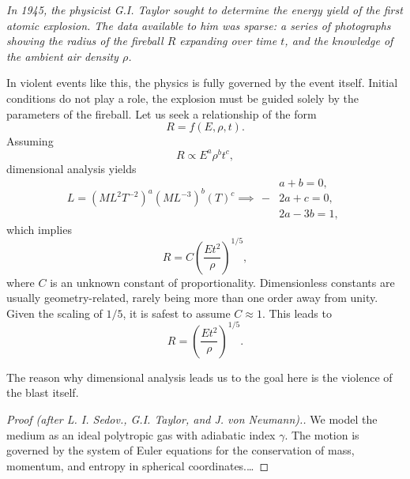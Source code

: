 \documentclass{antiquebook}
\begin{document}
    \begin{problem}
        \textit{In 1945, the physicist G.I. Taylor sought to determine the energy yield of the first atomic explosion. The data available to him was sparse: a series of photographs showing the radius of the fireball $R$ expanding over time $t$, and the knowledge of the ambient air density $\rho$.}
    \end{problem}
    \begin{solution}
        In violent events like this, the physics is fully governed by the event itself. Initial conditions do not play a role, the explosion must be guided solely by the parameters of the fireball. Let us seek a relationship of the form
        \begin{equation}
            R = f(E, \rho, t).
        \end{equation}
        Assuming
        \begin{equation}
            R \propto E^a \rho^b t^c,
        \end{equation}
        dimensional analysis yields
        \begin{equation}
            L = {(M L^2 T^{-2})}^a {(M L^{-3})}^b (T)^c \implies \begin{aligned}
                &a + b = 0,\\
                -&2a + c = 0,\\
                &2a - 3b = 1,
            \end{aligned}
        \end{equation}
        which implies
        \begin{equation}
            R = C \left( \frac{E t^2}{\rho}\right)^{1/5},
        \end{equation}
        where \(C\) is an unknown constant of proportionality. Dimensionless constants are usually geometry-related, rarely being more than one order away from unity. Given the scaling of \(1/5\), it is safest to assume \(C \approx 1\). This leads to
        \begin{equation}
            R = {\left( \frac{E t^2}{\rho}\right)}^{1/5}.
        \end{equation}
    \end{solution}
    \begin{note}
        The reason why dimensional analysis leads us to the goal here is the violence of the blast itself.
    \end{note}
    \begin{proof}[Proof \textit{(after L. I. Sedov., G.I. Taylor, and J. von Neumann)}.]\small
        We model the medium as an ideal polytropic gas with adiabatic index $\gamma$. The motion is governed by the system of Euler equations for the conservation of mass, momentum, and entropy in spherical coordinates.\dots
\end{proof}
\end{document}

